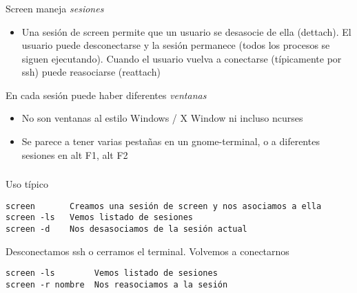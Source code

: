 \documentclass[ucs]{beamer}
\begin{document}
\begin{frame}[fragile]
\frametitle{}
Screen maneja \emph{sesiones} 

\begin{itemize}
\item
Una sesión de screen
permite que un usuario se desasocie de ella (dettach). El
usuario puede desconectarse y la sesión permanece (todos los procesos
se siguen ejecutando).
Cuando el usuario vuelva a conectarse (típicamente por ssh)
puede reasociarse (reattach) 
\end{itemize}

En cada sesión puede haber
diferentes \emph{ventanas}
\begin{itemize}
\item
No son ventanas al estilo Windows / X Window ni incluso ncurses
\item
Se parece a tener varias pestañas en un gnome-terminal, o a diferentes sesiones en alt F1, alt F2
\end{itemize}


\end{frame}


\begin{frame}[fragile]
\frametitle{}
Uso típico
  \begin{footnotesize}
  \begin{verbatim}
screen       Creamos una sesión de screen y nos asociamos a ella
screen -ls   Vemos listado de sesiones
screen -d    Nos desasociamos de la sesión actual
  \end{verbatim}
  \end{footnotesize}
Desconectamos ssh o cerramos el terminal. Volvemos a conectarnos

  \begin{footnotesize}
  \begin{verbatim}
screen -ls        Vemos listado de sesiones
screen -r nombre  Nos reasociamos a la sesión
  \end{verbatim}
  \end{footnotesize}
\end{frame}
\end{document}
